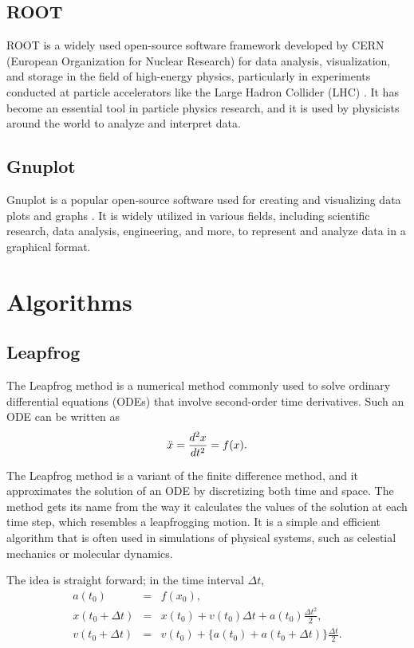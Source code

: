 \documentclass[a4paper,oneside,12pt]{report}
\numberwithin{equation}{chapter}
\begin{document}
\subsection{ROOT}
ROOT is a widely used open-source software framework developed by CERN (European Organization for Nuclear Research) for data analysis,
visualization, and storage in the field of high-energy physics, particularly in experiments conducted at particle accelerators 
like the Large Hadron Collider (LHC) \cite{root}. It has become an essential tool in particle physics research, 
and it is used by physicists around the world to analyze and interpret data.

\subsection{Gnuplot}
Gnuplot is a popular open-source software used for creating and visualizing data plots and graphs  \cite{gnuplot}. 
It is widely utilized in various fields, including scientific research, data analysis, engineering, and more, 
to represent and analyze data in a graphical format. 


\section{Algorithms}

\subsection{Leapfrog} \label{sec:leapfrog}
The Leapfrog method is a numerical method commonly used to solve ordinary differential equations (ODEs) that involve second-order time derivatives. Such an ODE can be written as
\vspace{-15pt}
\begin{equation}
    \ddot{x} = \derivS{x}{t} = f(x) .\label{eq:second-order-ODE}
\vspace{-10pt}\end{equation}

The Leapfrog method is a variant of the finite difference method, and it approximates the solution of an ODE by discretizing both time and space. 
The method gets its name from the way it calculates the values of the solution at each time step, which resembles a leapfrogging motion. 
It is a simple and efficient algorithm that is often used in simulations of physical systems, such as celestial mechanics or molecular dynamics.

The idea is straight forward; in the time interval $\Delta t$, 
\vspace{-20pt}
\begin{eqnarray}
    a(t_0) &=& f(x_0)   , \\
    x(t_0 + \Delta t) &=& x(t_0) + v(t_0)\Delta t + a(t_0)\frac{\Delta t^2}{2}   ,\label{eq:leapfrog_sync_x}\\
    v(t_0 + \Delta t) &=& v(t_0) + \{ a(t_0) + a(t_0 + \Delta t)\}\frac{\Delta t}{2} . \label{eq:leapfrog_sync_v}
\end{eqnarray}
\end{document}
